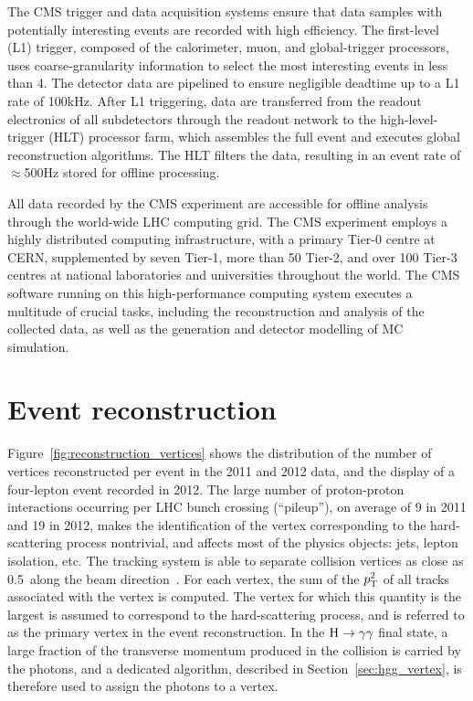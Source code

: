 \documentclass[12pt,twoside,a4paper,cmspaper,final,collab]{cms-tdr}
\begin{document}
The CMS trigger and data acquisition systems ensure that data samples with potentially
interesting events are recorded with high efficiency. The first-level (L1)
trigger, composed of the calorimeter, muon, and global-trigger
processors, uses
coarse-granularity information to select the most interesting events in less than 4\mus. The
detector data are pipelined to ensure negligible deadtime up to a L1
rate of 100\unit{kHz}.
After L1 triggering, data are transferred from the readout electronics of all subdetectors
through the readout network to the high-level-trigger (HLT) processor farm, which
assembles the full event and executes global reconstruction algorithms.  The HLT filters the data, resulting
in an event rate of $\approx$500\unit{Hz} stored for offline processing.

All data recorded by the CMS experiment are accessible for offline analysis
through the world-wide LHC computing grid.
The CMS experiment employs a highly distributed computing infrastructure, with a
primary Tier-0 centre at CERN, supplemented by seven Tier-1, more than 50 Tier-2, and over 100
Tier-3 centres at national laboratories and universities throughout
the world.
The CMS software running on this high-perfor\-mance
computing system executes a multitude of crucial tasks, including the reconstruction
and analysis of the collected data, as well as the generation and
detector modelling of MC simulation.

\section{Event reconstruction}\label{sec:reconstruction}
Figure~\ref{fig:reconstruction_vertices} shows the distribution
of the number of vertices reconstructed per event in the 2011 and 2012 data, and the display of a four-lepton event recorded in 2012.
The large number of proton-proton interactions occurring per LHC bunch crossing  (``pileup''),
on average of 9 in 2011 and 19 in 2012,
makes the identification of the vertex corresponding to the hard-scattering process nontrivial,
and affects most of the physics objects: jets, lepton isolation, etc.
The tracking system is able to separate collision vertices as close as 0.5~\mm along the beam direction~\cite{IEEE_DetAnnealing}.
For each vertex, the sum of the $p_{\mathrm{T}}^2$ of all tracks associated with the vertex
is computed. The vertex for which this quantity is the largest is assumed to correspond to the hard-scattering
process, and is referred to as the primary vertex in the event reconstruction.
In the $\mathrm{H}\to\gamma\gamma$ final state, a large fraction of the transverse momentum produced in the collision is carried by the photons,
 and a dedicated algorithm,
described in Section~\ref{sec:hgg_vertex}, is therefore used to assign the photons to a vertex.
\end{document}
